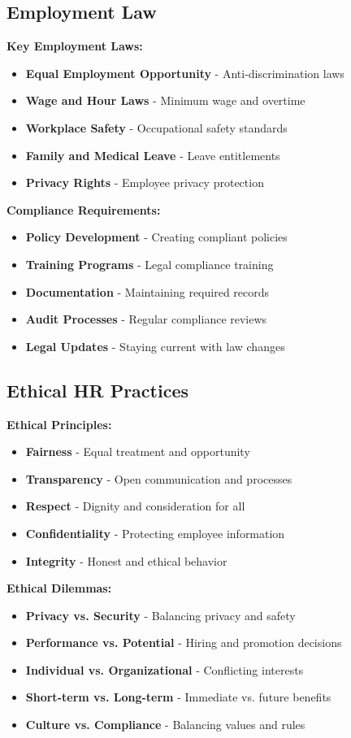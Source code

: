 \documentclass[12pt]{article}
\begin{document}
\subsection{Employment Law}

\textbf{Key Employment Laws:}
\begin{itemize}
    \item \textbf{Equal Employment Opportunity} - Anti-discrimination laws
    \item \textbf{Wage and Hour Laws} - Minimum wage and overtime
    \item \textbf{Workplace Safety} - Occupational safety standards
    \item \textbf{Family and Medical Leave} - Leave entitlements
    \item \textbf{Privacy Rights} - Employee privacy protection
\end{itemize}

\textbf{Compliance Requirements:}
\begin{itemize}
    \item \textbf{Policy Development} - Creating compliant policies
    \item \textbf{Training Programs} - Legal compliance training
    \item \textbf{Documentation} - Maintaining required records
    \item \textbf{Audit Processes} - Regular compliance reviews
    \item \textbf{Legal Updates} - Staying current with law changes
\end{itemize}

\subsection{Ethical HR Practices}

\textbf{Ethical Principles:}
\begin{itemize}
    \item \textbf{Fairness} - Equal treatment and opportunity
    \item \textbf{Transparency} - Open communication and processes
    \item \textbf{Respect} - Dignity and consideration for all
    \item \textbf{Confidentiality} - Protecting employee information
    \item \textbf{Integrity} - Honest and ethical behavior
\end{itemize}

\textbf{Ethical Dilemmas:}
\begin{itemize}
    \item \textbf{Privacy vs. Security} - Balancing privacy and safety
    \item \textbf{Performance vs. Potential} - Hiring and promotion decisions
    \item \textbf{Individual vs. Organizational} - Conflicting interests
    \item \textbf{Short-term vs. Long-term} - Immediate vs. future benefits
    \item \textbf{Culture vs. Compliance} - Balancing values and rules
\end{itemize}
\end{document}
